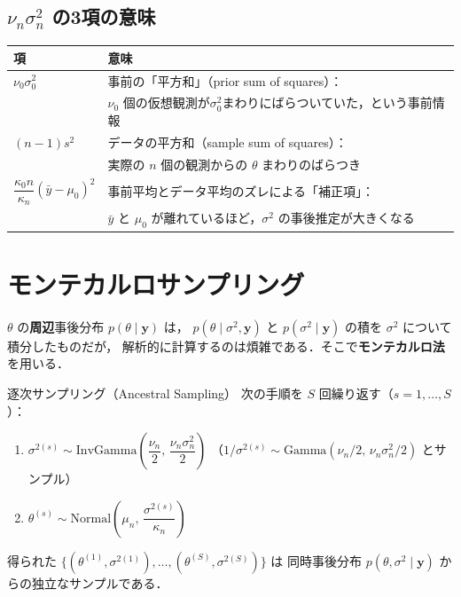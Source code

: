 \documentclass[lualatex,ja=standard,a4paper,12pt]{bxjsarticle}
\begin{document}
\subsection{$\nu_n\sigma_n^2$ の3項の意味}

\begin{center}
\renewcommand{\arraystretch}{1.5}
\begin{tabular}{lp{8cm}}
\toprule
\textbf{項} & \textbf{意味} \\
\midrule
$\nu_0\sigma_0^2$ & 事前の「平方和」（prior sum of squares）：\\
& $\nu_0$ 個の仮想観測が$\sigma_0^2$まわりにばらついていた，という事前情報 \\[4pt]
$(n-1)s^2$ & データの平方和（sample sum of squares）：\\
& 実際の $n$ 個の観測からの $\theta$ まわりのばらつき \\[4pt]
$\dfrac{\kappa_0 n}{\kappa_n}(\bar{y}-\mu_0)^2$ & 事前平均とデータ平均のズレによる「補正項」：\\
& $\bar{y}$ と $\mu_0$ が離れているほど，$\sigma^2$ の事後推定が大きくなる \\
\bottomrule
\end{tabular}
\end{center}


\section{モンテカルロサンプリング}

$\theta$ の\textbf{周辺}事後分布 $p(\theta \mid \mathbf{y})$ は，
$p(\theta \mid \sigma^2, \mathbf{y})$ と $p(\sigma^2 \mid \mathbf{y})$ の積を $\sigma^2$ について積分したものだが，
解析的に計算するのは煩雑である．そこで\textbf{モンテカルロ法}を用いる．

\begin{thmbox}{逐次サンプリング（Ancestral Sampling）}
次の手順を $S$ 回繰り返す（$s = 1, \ldots, S$）：
\begin{enumerate}
  \item $\sigma^{2(s)} \sim \mathrm{InvGamma}\!\left(\dfrac{\nu_n}{2},\, \dfrac{\nu_n\sigma_n^2}{2}\right)$
        \hfill（$1/\sigma^{2(s)} \sim \mathrm{Gamma}(\nu_n/2,\, \nu_n\sigma_n^2/2)$ とサンプル）
  \item $\theta^{(s)} \sim \mathrm{Normal}\!\left(\mu_n,\, \dfrac{\sigma^{2(s)}}{\kappa_n}\right)$
\end{enumerate}

得られた $\{(\theta^{(1)}, \sigma^{2(1)}), \ldots, (\theta^{(S)}, \sigma^{2(S)})\}$ は
同時事後分布 $p(\theta, \sigma^2 \mid \mathbf{y})$ からの独立なサンプルである．
\end{thmbox}
\end{document}
